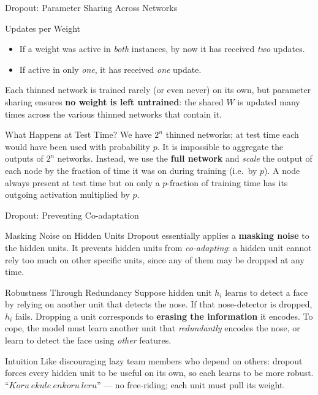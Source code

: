 \documentclass{beamer}
\begin{document}
\begin{frame}[shrink=10]{Dropout: Parameter Sharing Across Networks}
  \begin{block}{Updates per Weight}
    \begin{itemize}\setlength\itemsep{3pt}
      \item If a weight was active in \emph{both} instances, by now it has
            received \emph{two} updates.
      \item If active in only \emph{one}, it has received \emph{one}
            update.
    \end{itemize}
    Each thinned network is trained rarely (or even never) on its own, but
    parameter sharing ensures \textbf{no weight is left untrained}: the
    shared $W$ is updated many times across the various thinned networks
    that contain it.
  \end{block}

  \begin{block}{What Happens at Test Time?}
    We have $2^{n}$ thinned networks; at test time each would have been used
    with probability $p$. It is impossible to aggregate the outputs of
    $2^{n}$ networks. Instead, we use the \textbf{full network} and
    \emph{scale} the output of each node by the fraction of time it was on
    during training (i.e.\ by $p$). A node always present at test time but
    on only a $p$-fraction of training time has its outgoing activation
    multiplied by $p$.
  \end{block}
\end{frame}

\begin{frame}[shrink=10]{Dropout: Preventing Co-adaptation}
  \begin{block}{Masking Noise on Hidden Units}
    Dropout essentially applies a \textbf{masking noise} to the hidden
    units. It prevents hidden units from \emph{co-adapting}: a hidden unit
    cannot rely too much on other specific units, since any of them may be
    dropped at any time.
  \end{block}

  \begin{block}{Robustness Through Redundancy}
    Suppose hidden unit $h_i$ learns to detect a face by relying on another
    unit that detects the nose. If that nose-detector is dropped, $h_i$
    fails. Dropping a unit corresponds to \textbf{erasing the information}
    it encodes. To cope, the model must learn another unit that
    \emph{redundantly} encodes the nose, or learn to detect the face using
    \emph{other} features.
  \end{block}

  \begin{alertblock}{Intuition}
    Like discouraging lazy team members who depend on others: dropout
    forces every hidden unit to be useful on its own, so each learns to be
    more robust. ``$Koru\ ekule\ enkoru\ leru$'' --- no free-riding; each
    unit must pull its weight.
  \end{alertblock}
\end{frame}
\end{document}
